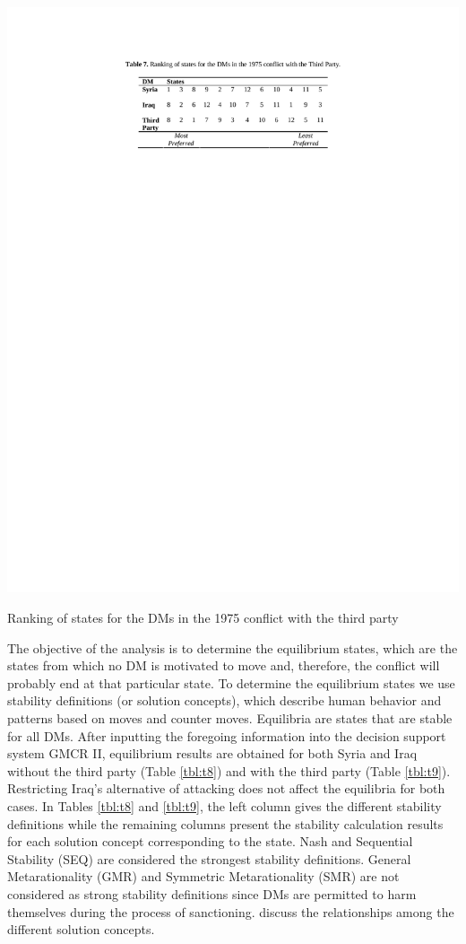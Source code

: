 \documentclass[letterpaper,12pt,titlepage,oneside,final]{book}
\begin{document}
\begin{table}[H]
\centering
\includegraphics[scale=1]{PDF-IMG/tables/7.pdf}

\caption{Ranking of states for the DMs in the 1975 conflict with the third party}

\label{tbl:t7}
\end{table}

The objective of the analysis is to determine the equilibrium states, which are the states from which no DM is motivated to move and, therefore, the conflict will probably end at that particular state. To determine the equilibrium states we use stability definitions (or solution concepts), which describe human behavior and patterns based on moves and counter moves. Equilibria are states that are stable for all DMs. After inputting the foregoing information into the decision support system GMCR II, equilibrium results are obtained for both Syria and Iraq without the third party (Table \ref{tbl:t8}) and with the third party (Table \ref{tbl:t9}). Restricting Iraq's alternative of attacking does not affect the equilibria for both cases. In Tables \ref{tbl:t8} and \ref{tbl:t9}, the left column gives the different stability definitions while the remaining columns present the stability calculation results for each solution concept corresponding to the state. Nash and Sequential Stability (SEQ) are considered the strongest stability definitions. General Metarationality (GMR) and Symmetric Metarationality (SMR) are not considered as strong stability definitions since DMs are permitted to harm themselves during the process of sanctioning. \citet{Fang1989} discuss the relationships among the different solution concepts.
\end{document}
